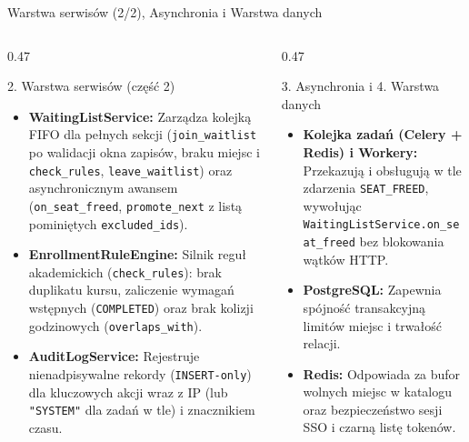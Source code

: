 \documentclass[aspectratio=169, 10pt, xcolor=table]{beamer}
\begin{document}
\begin{frame}{Warstwa serwisów (2/2), Asynchronia i Warstwa danych}
    \footnotesize
    \begin{columns}[T, onlytextwidth]
        \begin{column}{0.47\textwidth}
            \begin{block}{2. Warstwa serwisów (część 2)}
                \begin{itemize}
                    \item \textbf{WaitingListService:} Zarządza kolejką FIFO dla pełnych sekcji (\texttt{join\_waitlist} po walidacji okna zapisów, braku miejsc i \texttt{check\_rules}, \texttt{leave\_waitlist}) oraz asynchronicznym awansem (\texttt{on\_seat\_freed}, \texttt{promote\_next} z listą pominiętych \texttt{excluded\_ids}).
                    \item \textbf{EnrollmentRuleEngine:} Silnik reguł akademickich (\texttt{check\_rules}): brak duplikatu kursu, zaliczenie wymagań wstępnych (\texttt{COMPLETED}) oraz brak kolizji godzinowych (\texttt{overlaps\_with}).
                    \item \textbf{AuditLogService:} Rejestruje nienadpisywalne rekordy (\texttt{INSERT-only}) dla kluczowych akcji wraz z IP (lub \texttt{"SYSTEM"} dla zadań w tle) i znacznikiem czasu.
                \end{itemize}
            \end{block}
        \end{column}
        \begin{column}{0.47\textwidth}
            \begin{exampleblock}{3. Asynchronia i 4. Warstwa danych}
                \begin{itemize}
                    \item \textbf{Kolejka zadań (Celery + Redis) i Workery:} Przekazują i obsługują w tle zdarzenia \texttt{SEAT\_FREED}, wywołując \texttt{WaitingListService.on\_seat\_freed} bez blokowania wątków HTTP.
                    \item \textbf{PostgreSQL:} Zapewnia spójność transakcyjną limitów miejsc i trwałość relacji.
                    \item \textbf{Redis:} Odpowiada za bufor wolnych miejsc w katalogu oraz bezpieczeństwo sesji SSO i czarną listę tokenów.
                \end{itemize}
            \end{exampleblock}
        \end{column}
    \end{columns}
\end{frame}
\end{document}
